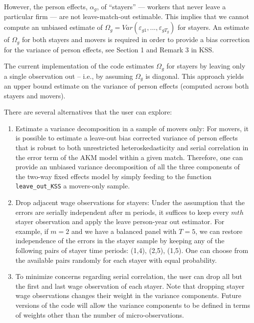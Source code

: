 \documentclass[11pt]{article}
\begin{document}
However, the person effects, \(\alpha_{g}\), of ``stayers'' --- workers
that never leave a particular firm --- are not leave-match-out
estimable. This implies that we cannot compute an unbiased estimate of
\(\Omega_{g}=Var(\varepsilon_{g1},...,\varepsilon_{gT_{g}})\) for
stayers. An estimate of \(\Omega_{g}\) for both stayers and movers is
required in order to provide a bias correction for the variance of
person effects, see Section 1 and Remark 3 in KSS.

The current implementation of the code estimates 
$\Omega_{g}$ for stayers by leaving only a single observation out -- i.e., by assuming $\Omega_g$ is diagonal. This approach yields an upper bound estimate on
the variance of person effects (computed across both stayers and
movers).

There are several alternatives that the user can explore:

\begin{enumerate}
\def\labelenumi{\arabic{enumi}.}
\item
  Estimate a variance decomposition in a sample of movers only: For
  movers, it is possible to estimate a leave-out bias corrected variance
  of person effects that is robust to both unrestricted
  heteroskedasticity and serial correlation in the error term of the AKM
  model within a given match. Therefore, one can provide an unbiased
  variance decomposition of all the three components of the two-way
  fixed effects model by simply feeding to the function
  \texttt{leave\_out\_KSS} a movers-only sample.
\item
  Drop adjacent wage observations for stayers: Under the assumption that
  the errors are serially independent after m periods, it suffices to
  keep every \(mth\) stayer observation and apply the leave person-year
  out estimator. For example, if \(m=2\) and we have a balanced panel
  with \(T=5\), we can restore independence of the errors in the stayer
  sample by keeping any of the following pairs of stayer time periods:
  (1,4), (2,5), (1,5). One can choose from the available pairs randomly
  for each stayer with equal probability.
 \item 
  To minimize concerns regarding serial correlation, the user can drop all but the first and last wage observation of each stayer. Note that dropping stayer wage observations changes their weight in the variance components. Future versions of the code will allow the variance components to be defined in terms of weights other than the number of micro-observations.
\end{enumerate}
\end{document}
